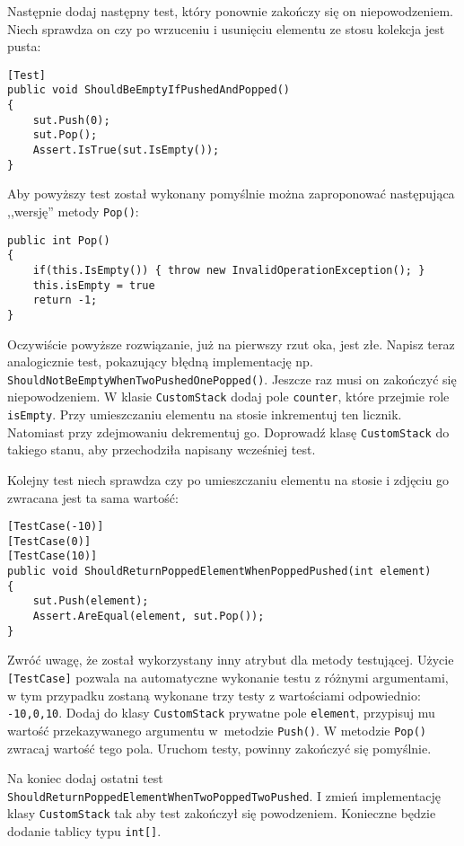 Następnie dodaj następny test, który ponownie zakończy się on niepowodzeniem. Niech sprawdza on czy po wrzuceniu i usunięciu elementu ze stosu kolekcja jest pusta:
\begin{lstlisting}
[Test]
public void ShouldBeEmptyIfPushedAndPopped()
{
	sut.Push(0);
	sut.Pop();
	Assert.IsTrue(sut.IsEmpty());
}
\end{lstlisting}

Aby powyższy test został wykonany pomyślnie można zaproponować następująca ,,wersję'' metody \texttt{Pop()}:
\begin{lstlisting}
public int Pop()
{
	if(this.IsEmpty()) { throw new InvalidOperationException(); }
	this.isEmpty = true
	return -1;
}
\end{lstlisting}

Oczywiście powyższe rozwiązanie, już na pierwszy rzut oka, jest złe. Napisz teraz analogicznie test, pokazujący błędną implementację np. \texttt{ShouldNotBeEmptyWhenTwoPushedOnePopped()}. Jeszcze raz musi on zakończyć się niepowodzeniem. W klasie \texttt{CustomStack} dodaj pole \texttt{counter}, które przejmie role \texttt{isEmpty}. Przy umieszczaniu elementu na stosie inkrementuj ten licznik. Natomiast przy zdejmowaniu dekrementuj go. Doprowadź klasę \texttt{CustomStack} do takiego stanu, aby przechodziła napisany wcześniej test.

Kolejny test niech sprawdza czy po umieszczaniu elementu na stosie i zdjęciu go zwracana jest ta sama wartość:
\begin{lstlisting}
[TestCase(-10)]
[TestCase(0)]
[TestCase(10)]
public void ShouldReturnPoppedElementWhenPoppedPushed(int element)
{
	sut.Push(element);
	Assert.AreEqual(element, sut.Pop());
}
\end{lstlisting}

Zwróć uwagę, że został wykorzystany inny atrybut dla metody testującej. Użycie \texttt{[TestCase]} pozwala na automatyczne wykonanie testu z różnymi argumentami, w tym przypadku zostaną wykonane trzy testy z wartościami odpowiednio: \texttt{-10,0,10}. Dodaj do klasy \texttt{CustomStack} prywatne pole \texttt{element}, przypisuj mu wartość przekazywanego argumentu w~metodzie \texttt{Push()}. W metodzie \texttt{Pop()} zwracaj wartość tego pola. Uruchom testy, powinny zakończyć się pomyślnie.

Na koniec dodaj ostatni test \texttt{ShouldReturnPoppedElementWhenTwoPoppedTwoPushed}. I zmień implementację klasy \texttt{CustomStack} tak aby test zakończył się powodzeniem. Konieczne będzie dodanie tablicy typu \texttt{int[]}.


